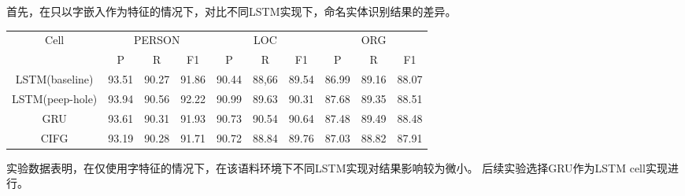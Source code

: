 首先，在只以字嵌入作为特征的情况下，对比不同LSTM实现下，命名实体识别结果的差异。
\begin{table}[H]
    \centering
    \begin{tabular}{cccccccccc}
        \toprule
            \multirow{2}{*}{Cell} &\multicolumn{3}{c}{PERSON} &\multicolumn{3}{c}{LOC} &\multicolumn{3}{c}{ORG}\\
            \cmidrule(lr){2-4} \cmidrule(lr){5-7} \cmidrule(lr){8-10}
            & P & R & F1 & P & R & F1 & P & R & F1\\
        \midrule
        LSTM(baseline) & 93.51 & 90.27 & 91.86 & 90.44 & 88,66 & 89.54 & 86.99 & 89.16 & 88.07\\
        LSTM(peep-hole) & 93.94 & 90.56 & 92.22 & 90.99 & 89.63 & 90.31 & 87.68 & 89.35 & 88.51\\
        GRU & 93.61 & 90.31 & 91.93 & 90.73 & 90.54 & 90.64 & 87.48 & 89.49 & 88.48\\
        CIFG  & 93.19 & 90.28 & 91.71 & 90.72 & 88.84 & 89.76 & 87.03 & 88.82 & 87.91\\
        \bottomrule
    \end{tabular}
    \label{tab:lstm_cell_comparison}
\end{table}

实验数据表明，在仅使用字特征的情况下，在该语料环境下不同LSTM实现对结果影响较为微小。
后续实验选择GRU作为LSTM cell实现进行。

